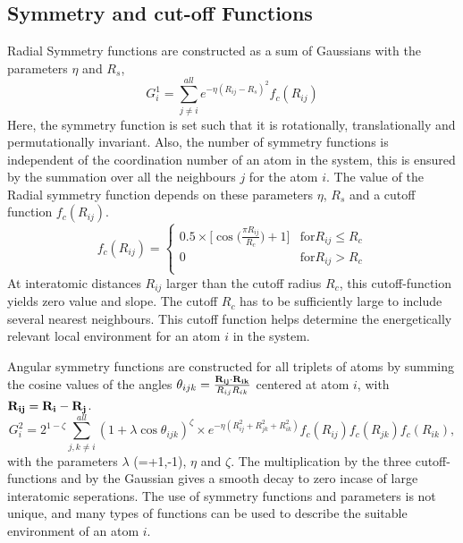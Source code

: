 \documentclass[11pt,a4paper]{report}
\begin{document}
{\subsection{Symmetry and cut-off Functions}
Radial Symmetry functions are constructed as a sum of Gaussians with the parameters $\eta$ and $R_s$, 
\begin{equation} \label{rad_sym}
G^1_i=\sum_{j\neq i}^{all}{e^{-\eta(R_{ij}-R_s)^2} f_c(R_{ij})} 
\end{equation}
Here, the symmetry function is set such that it is rotationally, translationally and permutationally invariant. Also, the number of symmetry functions is independent of the coordination number of an atom in the system, this is ensured by the summation over all the neighbours $j$ for the atom $i$. The value of the Radial symmetry function depends on these parameters $\eta$, $R_s$ and a cutoff function $f_c(R_{ij})$. 
\begin{equation} \label{cutoff}
f_c(R_{ij})=
\begin{cases} 
0.5 \times \Big[\cos \Big(\frac{\pi R_{ij}}{R_c}\Big)+1\Big] & \text{for} R_{ij} \leq R_c\\
0 & \text{for} R_{ij} > R_c\\
\end{cases}
\end{equation}
At interatomic distances $R_{ij}$ larger than the cutoff radius $R_c$, this cutoff-function yields zero value and slope. The cutoff $R_c$ has to be sufficiently large to include several nearest neighbours. This cutoff function helps determine the energetically relevant local environment for an atom $i$ in the system.

Angular symmetry functions are constructed for all triplets of atoms by summing the cosine values of the angles $\theta_{ijk} = \frac{\mathbf {R_{ij} \cdot R_{ik}} \\}{R_{ij}R_{ik}}$ centered at atom $i$, with $\mathbf{R_{ij}=R_i-R_j}\\$.
\begin{equation} \label{ang_sym}
G^2_i=2^{1-\zeta}\sum_{j,k \ne i}^{all}{(1+\lambda\cos{\theta_{ijk}})^{\zeta} } \times e^{-\eta(R^2_{ij}+R^2_{jk}+R^2_{ik})} f_c(R_{ij})f_c(R_{jk})f_c(R_{ik}),
\end{equation}
with the parameters $\lambda$ (=+1,-1), $\eta$ and $\zeta$. The multiplication by the three cutoff-functions and by the Gaussian gives a smooth decay to zero incase of large interatomic seperations. The use of symmetry functions and parameters is not unique, and many types of functions can be used to describe the suitable environment of an atom $i$.

}
\end{document}
